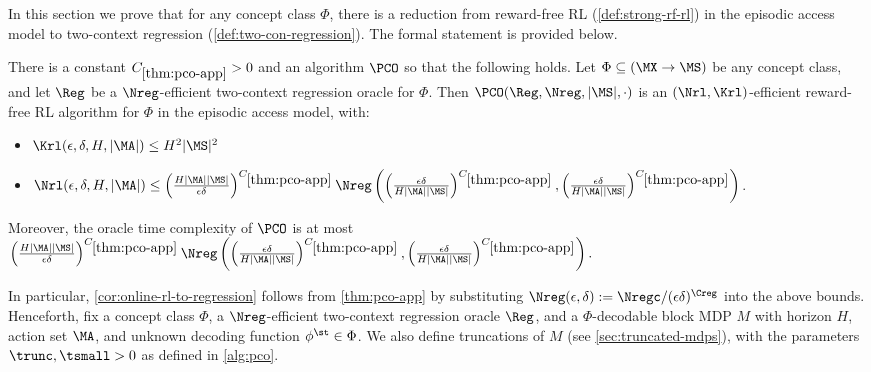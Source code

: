 

In this section we prove that for any concept class $\Phi$, there is a reduction from reward-free RL (\cref{def:strong-rf-rl}) in the episodic access model to two-context regression (\cref{def:two-con-regression}). The formal statement is provided below.

\begin{theorem}\label{thm:pco-app}
There is a constant $C_{\ref{thm:pco-app}}>0$ and an algorithm $\PCO$ so that the following holds. Let $\Phi \subseteq (\MX\to\MS)$ be any concept class, and let $\Reg$ be a $\Nreg$-efficient two-context regression oracle for $\Phi$. Then $\PCO(\Reg,\Nreg,|\MS|,\cdot)$ %
is an $(\Nrl,\Krl)$-efficient reward-free RL algorithm for $\Phi$ in the episodic access model, with:
\begin{itemize}
    \item $\Krl(\epsilon,\delta,H,|\MA|) \leq H^2|\MS|^2$
    \item $\Nrl(\epsilon,\delta,H,|\MA|) \leq \left(\frac{H|\MA||\MS|}{\epsilon\delta}\right)^{C_{\ref{thm:pco-app}}} \Nreg\left(\left(\frac{\epsilon\delta}{H|\MA||\MS|}\right)^{C_{\ref{thm:pco-app}}},\left(\frac{\epsilon\delta}{H|\MA||\MS|}\right)^{C_{\ref{thm:pco-app}}}\right)$.
\end{itemize}
Moreover, the oracle time complexity of $\PCO$ is at most $\left(\frac{H|\MA||\MS|}{\epsilon\delta}\right)^{C_{\ref{thm:pco-app}}} \Nreg\left(\left(\frac{\epsilon\delta}{H|\MA||\MS|}\right)^{C_{\ref{thm:pco-app}}},\left(\frac{\epsilon\delta}{H|\MA||\MS|}\right)^{C_{\ref{thm:pco-app}}}\right).$
\end{theorem}

In particular, \cref{cor:online-rl-to-regression} follows from \cref{thm:pco-app} by substituting $\Nreg(\epsilon,\delta) := \Nregc/(\epsilon\delta)^{\Creg}$ into the above bounds. Henceforth, fix a concept class $\Phi$, a $\Nreg$-efficient two-context regression oracle $\Reg$, and a $\Phi$-decodable block MDP $M$ with horizon $H$, action set $\MA$, and unknown decoding function $\phi^\st \in \Phi$. We also define truncations of $M$ (see \cref{sec:truncated-mdps}), with the parameters $\trunc,\tsmall>0$ as defined in \cref{alg:pco}.

